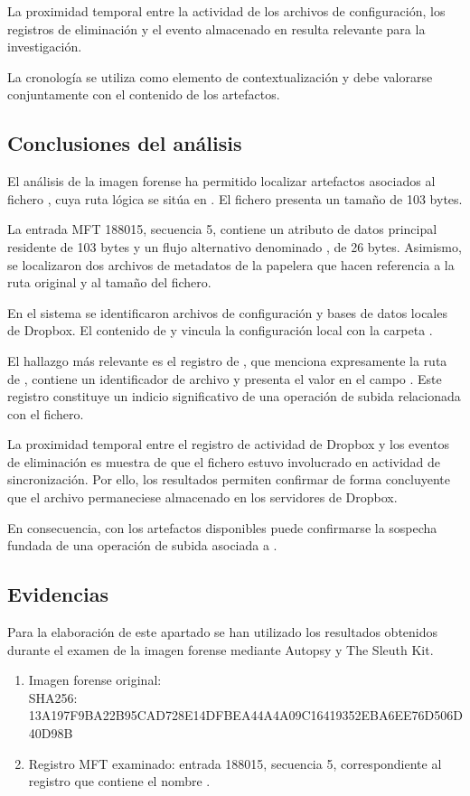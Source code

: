 La proximidad temporal entre la actividad de los archivos de configuración,
los registros de eliminación y el evento almacenado en
 resulta relevante para la investigación.

La cronología se utiliza como elemento de contextualización y debe
valorarse conjuntamente con el contenido de los artefactos.

\subsection{Conclusiones del análisis}
\label{sec:dropbox-conclusiones}

El análisis de la imagen forense ha permitido localizar artefactos
asociados al fichero , cuya ruta lógica se sitúa
en . El fichero presenta un
tamaño de 103 bytes.

La entrada MFT 188015, secuencia 5, contiene un atributo de datos
principal residente de 103 bytes y un flujo alternativo denominado
, de 26 bytes. Asimismo, se localizaron dos
archivos de metadatos de la papelera que hacen referencia a la ruta
original y al tamaño del fichero.

En el sistema se identificaron archivos de configuración y bases de
datos locales de Dropbox. El contenido de  y
 vincula la configuración local con la carpeta
.

El hallazgo más relevante es el registro de
, que menciona expresamente la ruta de
, contiene un identificador de archivo y presenta
el valor  en el campo . Este registro
constituye un indicio significativo de una operación de subida
relacionada con el fichero.

La proximidad temporal entre el registro de actividad de Dropbox y
los eventos de eliminación es muestra de que el fichero
estuvo involucrado en actividad de sincronización. Por ello, los resultados permiten
confirmar de forma concluyente que el archivo permaneciese almacenado en los servidores de Dropbox.

En consecuencia, con los artefactos disponibles puede confirmarse la
sospecha fundada de una operación de subida asociada a
.

\subsection{Evidencias}

Para la elaboración de este apartado se han utilizado los resultados
obtenidos durante el examen de la imagen forense  mediante
Autopsy y The Sleuth Kit.

\begin{enumerate}
	\item Imagen forense original:
	 \\
	SHA256: 13A197F9BA22B95CAD728E14DFBEA44A4A09C16419352EBA6EE76D506D40D98B
	\item Registro MFT examinado:
	entrada 188015, secuencia 5, correspondiente al registro que
	contiene el nombre .	
\end{enumerate}